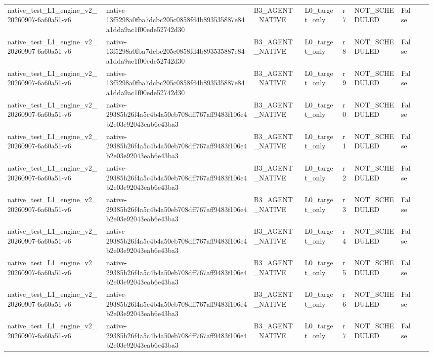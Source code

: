 \begin{tabular}{lllllllll}
native\_test\_L1\_engine\_v2\_20260907-6a60a51-v6 & native-13f5298a0fba7dcbc205c0858fd4b893535887e84a1dda9ac1f00ede52742d30 & B3\_AGENT\_NATIVE & L0\_target\_only & r7 & NOT\_SCHEDULED & False &  &  \\
native\_test\_L1\_engine\_v2\_20260907-6a60a51-v6 & native-13f5298a0fba7dcbc205c0858fd4b893535887e84a1dda9ac1f00ede52742d30 & B3\_AGENT\_NATIVE & L0\_target\_only & r8 & NOT\_SCHEDULED & False &  &  \\
native\_test\_L1\_engine\_v2\_20260907-6a60a51-v6 & native-13f5298a0fba7dcbc205c0858fd4b893535887e84a1dda9ac1f00ede52742d30 & B3\_AGENT\_NATIVE & L0\_target\_only & r9 & NOT\_SCHEDULED & False &  &  \\
native\_test\_L1\_engine\_v2\_20260907-6a60a51-v6 & native-29385b26f4a5c4b4a50eb708dff767aff9483f106e4b2e03e92043eab6e43ba3 & B3\_AGENT\_NATIVE & L0\_target\_only & r0 & NOT\_SCHEDULED & False &  &  \\
native\_test\_L1\_engine\_v2\_20260907-6a60a51-v6 & native-29385b26f4a5c4b4a50eb708dff767aff9483f106e4b2e03e92043eab6e43ba3 & B3\_AGENT\_NATIVE & L0\_target\_only & r1 & NOT\_SCHEDULED & False &  &  \\
native\_test\_L1\_engine\_v2\_20260907-6a60a51-v6 & native-29385b26f4a5c4b4a50eb708dff767aff9483f106e4b2e03e92043eab6e43ba3 & B3\_AGENT\_NATIVE & L0\_target\_only & r2 & NOT\_SCHEDULED & False &  &  \\
native\_test\_L1\_engine\_v2\_20260907-6a60a51-v6 & native-29385b26f4a5c4b4a50eb708dff767aff9483f106e4b2e03e92043eab6e43ba3 & B3\_AGENT\_NATIVE & L0\_target\_only & r3 & NOT\_SCHEDULED & False &  &  \\
native\_test\_L1\_engine\_v2\_20260907-6a60a51-v6 & native-29385b26f4a5c4b4a50eb708dff767aff9483f106e4b2e03e92043eab6e43ba3 & B3\_AGENT\_NATIVE & L0\_target\_only & r4 & NOT\_SCHEDULED & False &  &  \\
native\_test\_L1\_engine\_v2\_20260907-6a60a51-v6 & native-29385b26f4a5c4b4a50eb708dff767aff9483f106e4b2e03e92043eab6e43ba3 & B3\_AGENT\_NATIVE & L0\_target\_only & r5 & NOT\_SCHEDULED & False &  &  \\
native\_test\_L1\_engine\_v2\_20260907-6a60a51-v6 & native-29385b26f4a5c4b4a50eb708dff767aff9483f106e4b2e03e92043eab6e43ba3 & B3\_AGENT\_NATIVE & L0\_target\_only & r6 & NOT\_SCHEDULED & False &  &  \\
native\_test\_L1\_engine\_v2\_20260907-6a60a51-v6 & native-29385b26f4a5c4b4a50eb708dff767aff9483f106e4b2e03e92043eab6e43ba3 & B3\_AGENT\_NATIVE & L0\_target\_only & r7 & NOT\_SCHEDULED & False &  &  \\

\end{tabular}
